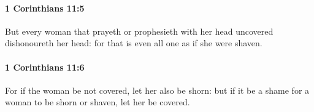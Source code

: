 		\paragraph{1 Corinthians 11:5} %
			\label{1CORINTHIANS-11-5}

			But every woman that prayeth or prophesieth with her head uncovered dishonoureth her head: for that is even all one as if she were shaven.

			\begin{framed}
				\scriptsize
				\begin{compactdesc}
					\item[SBLG] 
				\end{compactdesc}
			\end{framed}

		\paragraph{1 Corinthians 11:6} %
			\label{1CORINTHIANS-11-6}

			For if the woman be not covered, let her also be shorn: but if it be a shame for a woman to be shorn or shaven, let her be covered. 

